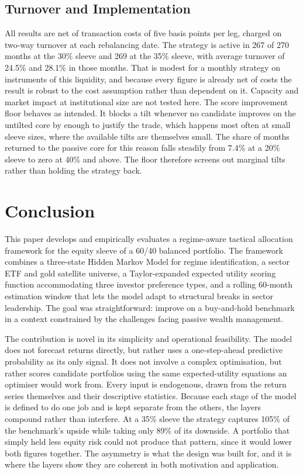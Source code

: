\documentclass[11pt, a4paper]{article}
\begin{document}
\subsection{Turnover and Implementation}

All results are net of transaction costs of five basis points per leg, charged on two-way
turnover at each rebalancing date. The strategy is active in 267 of 270 months at the 30\%
sleeve and 269 at the 35\% sleeve, with average turnover of 24.5\% and 28.1\% in those months.
That is modest for a monthly strategy on instruments of this liquidity, and because every
figure is already net of costs the result is robust to the cost assumption rather than
dependent on it. Capacity and market impact at institutional size are not tested here. The
score improvement floor behaves as intended. It blocks a tilt whenever no candidate improves on
the untilted core by enough to justify the trade, which happens most often at small sleeve
sizes, where the available tilts are themselves small. The share of months returned to the
passive core for this reason falls steadily from 7.4\% at a 20\% sleeve to zero at 40\% and
above. The floor therefore screens out marginal tilts rather than holding the strategy back.


\section{Conclusion}
\label{sec:conclusion}

This paper develops and empirically evaluates a regime-aware tactical allocation framework
for the equity sleeve of a 60/40 balanced portfolio. The framework combines a three-state
Hidden Markov Model for regime identification, a sector ETF and gold satellite universe, a
Taylor-expanded expected utility scoring function accommodating three investor preference
types, and a rolling 60-month estimation window that lets the model adapt to structural
breaks in sector leadership. The goal was straightforward: improve on a buy-and-hold
benchmark in a context constrained by the challenges facing passive wealth management.

The contribution is novel in its simplicity and operational feasibility. The model does not
forecast returns directly, but rather uses a one-step-ahead predictive probability as its
only signal. It does not involve a complex optimisation, but rather scores candidate
portfolios using the same expected-utility equations an optimiser would work from. Every
input is endogenous, drawn from the return series themselves and their descriptive
statistics. Because each stage of the model is defined to do one job and is kept separate
from the others, the layers compound rather than interfere. At a 35\% sleeve the strategy
captures 105\% of the benchmark's upside while taking only 89\% of its downside. A portfolio
that simply held less equity risk could not produce that pattern, since it would lower both
figures together. The asymmetry is what the design was built for, and it is where the layers
show they are coherent in both motivation and application.
\end{document}
